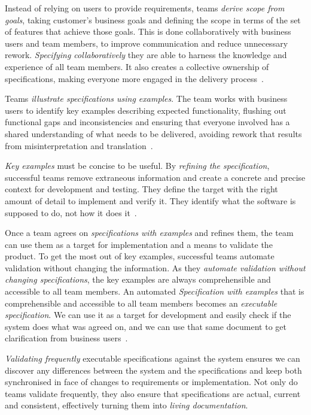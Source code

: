 \documentclass[dissertation,final]{softeng}
\begin{document}
Instead of relying on users to provide requirements, teams \emph{derive scope from goals}, taking customer's business goals and defining the scope in terms of the set of features that achieve those goals. This is done collaboratively with business users and team members, to improve communication and reduce unnecessary rework. \emph{Specifying collaboratively} they are able to harness the knowledge and experience of all team members. It also creates a collective ownership of specifications, making everyone more engaged in the delivery process~\citep{Adzic201106}.

Teams \emph{illustrate specifications using examples}. The team works with business users to identify key examples describing expected functionality, flushing out functional gaps and inconsistencies and ensuring that everyone involved has a shared understanding of what needs to be delivered, avoiding rework that results from misinterpretation and translation~\citep{Adzic201106}.

\emph{Key examples} must be concise to be useful. By \emph{refining the specification}, successful teams remove extraneous information and create a concrete and precise context for development and testing. They define the target with the right amount of detail to implement and verify it. They identify what the software is supposed to do, not how it does it~\citep{Adzic201106}.

Once a team agrees on \emph{specifications with examples} and refines them, the team can use them as a target for implementation and a means to validate the product. To get the most out of key examples, successful teams automate validation without changing the information. As they\emph{ automate validation without changing specifications}, the key examples are always comprehensible and accessible to all team members. An automated \emph{Specification with examples} that is comprehensible and accessible to all team members becomes an \emph{executable specification}. We can use it as a target for development and easily check if the system does what was agreed on, and we can use that same document to get clarification from business users~\citep{Adzic201106}.

\emph{Validating frequently} executable specifications against the system ensures we can discover any differences between the system and the specifications and keep both synchronised in face of changes to requirements or implementation. Not only do teams validate frequently, they also ensure that specifications are actual, current and consistent, effectively turning them into \emph{living documentation}.
\end{document}
